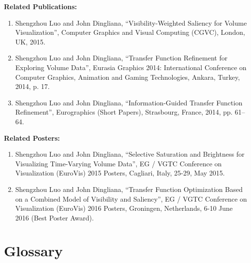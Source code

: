 \documentclass[a4paper, 12pt, twoside, openright]{report}         %
\begin{document}
\begin{thesisabstract}
\newpage
\cleardoublepage

\textbf{Related Publications:}\label{publication_list}
\begin{enumerate}
	\item Shengzhou Luo and John Dingliana, ``Visibility-Weighted Saliency for Volume Visualization'', Computer Graphics and Visual Computing (CGVC), London, UK, 2015.
	\item Shengzhou Luo and John Dingliana, ``Transfer Function Refinement for Exploring Volume Data'', Eurasia Graphics 2014: International Conference on Computer Graphics, Animation and Gaming Technologies, Ankara, Turkey, 2014, p. 17.
	\item Shengzhou Luo and John Dingliana, ``Information-Guided Transfer Function Refinement'', Eurographics (Short Papers), Strasbourg, France, 2014, pp. 61--64.
\end{enumerate}

\textbf{Related Posters:}
\begin{enumerate}
	\item Shengzhou Luo and John Dingliana, ``Selective Saturation and Brightness for Visualizing Time-Varying Volume Data'', EG / VGTC Conference on Visualization (EuroVis) 2015 Posters, Cagliari, Italy, 25-29, May 2015.
	\item Shengzhou Luo and John Dingliana, ``Transfer Function Optimization Based on a Combined Model of Visibility and Saliency'', EG / VGTC Conference on Visualization (EuroVis) 2016 Posters, Groningen, Netherlands, 6-10 June 2016 (Best Poster Award).
\end{enumerate}

\end{thesisabstract}

\cleardoublepage

\tableofcontents                                  %
\listoftables                                     %
\listoffigures                                    %

\chapter*{Glossary}
\end{document}
